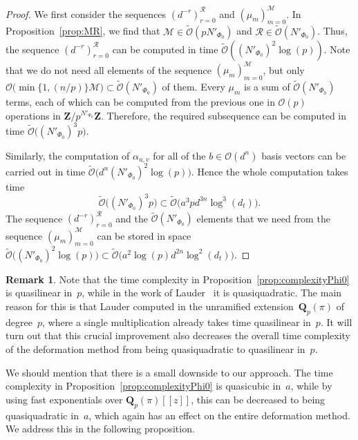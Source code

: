 \documentclass[a4paper,11pt]{article}
\numberwithin{equation}{section}
\newcommand{\ZZ}{\mathbf{Z}} %
\newcommand{\QQ}{\mathbf{Q}} %
\providecommand{\BigOh}{\mathcal{O}}          %
\providecommand{\SoftOh}{\tilde{\mathcal{O}}} %
\theoremstyle{definition}
\newtheorem{rem}[thm]{Remark}
\begin{document}
\begin{proof}
We first consider the 
sequences $(d^{-r})_{r=0}^{\mathcal{R}}$ and $(\mu_m)_{m=0}^{\mathcal{M}}$. 
In Proposition~\ref{prop:MR}, we find that 
$\mathcal{M} \in \SoftOh(p N'_{\Phi_0})$ and 
$\mathcal{R} \in \SoftOh(N'_{\Phi_0})$.  Thus, the sequence 
$(d^{-r})_{r=0}^{\mathcal{R}}$ can be computed in time 
$\SoftOh((N'_{\Phi_0})^2 \log(p))$.  Note that we do not 
need all elements of the sequence $( \mu_{m} )_{m=0}^{\mathcal{M}}$, but only 
$\BigOh\bigl( \min \{ 1,(n/p) \} \mathcal{M} \bigr) \subset \SoftOh(N'_{\Phi_0})$ 
of them.  Every $\mu_m$ is a sum of $\SoftOh(N'_{\Phi_0})$ terms, each 
of which can be computed from the previous one in $\BigOh(p)$ operations in 
$\ZZ/p^{N'_{\Phi_0}}\ZZ$.  Therefore, the required subsequence can be 
computed in time $\SoftOh\bigl((N'_{\Phi_0})^3 p\bigr)$.

Similarly, the computation of $\alpha_{u,v}$ for all of the 
$b \in \BigOh(d^n)$ basis vectors can be carried out in time 
$\SoftOh\bigl(d^n (N'_{\Phi_0})^2 \log(p)\bigr)$.  Hence the whole computation 
takes time 
\[
\SoftOh\bigl((N'_{\Phi_0})^3 p\bigr) 
    \subset \SoftOh\bigl(a^3 p d^{3n} \log^3(d_t)\bigr).
\]
The sequence $(d^{-r})_{r=0}^{\mathcal{R}}$ and the 
$\SoftOh(N'_{\Phi_0})$ elements that we need from the sequence 
$(\mu_{m})_{m=0}^{\mathcal{M}}$ can be stored in space 
$\SoftOh\bigl((N'_{\Phi_0})^2 \log (p)\bigr) \subset \SoftOh\bigl(a^2 \log(p) d^{2n} \log^2(d_t)\bigr)$.
\end{proof}

\begin{rem}
Note that the time complexity in Proposition~\ref{prop:complexityPhi0} 
is quasilinear in~$p$, while in the work of Lauder~\citep{Lauder2004a} 
it is quasiquadratic.  The main reason for this is that Lauder computed 
in the unramified extension~$\QQ_p(\pi)$ of degree~$p$, where a single 
multiplication already takes time quasilinear in~$p$.  It will turn out 
that this crucial improvement also decreases the overall time complexity 
of the deformation method from being quasiquadratic to quasilinear in~$p$.

We should mention that there is a small downside to our approach.  The time 
complexity in Proposition~\ref{prop:complexityPhi0} is quasicubic in~$a$, 
while by using fast exponentials over $\QQ_p(\pi)[[z]]$, this can be 
decreased to being quasiquadratic in~$a$, which again has an effect on the 
entire deformation method.  We address this in the following proposition.
\end{rem}
\end{document}
